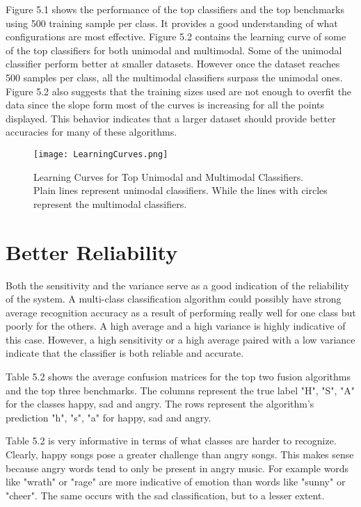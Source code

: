 Figure 5.1 shows the performance of the top classifiers and the top benchmarks using 500 training sample per class. 
It provides a good understanding of what configurations are most effective. Figure 5.2 contains the learning curve of some 
of the top classifiers for both unimodal and multimodal. Some of the unimodal classifier perform better at smaller datasets. However once the 
dataset reaches 500 samples per class,  all the multimodal classifiers surpass the unimodal ones. Figure 5.2 also suggests that the training sizes used are not enough
to overfit the data since the slope form most of the curves is increasing for all the points displayed. This behavior indicates that 
a larger dataset should provide better accuracies for many of these algorithms. 


\begin{figure}
 \centering
 \texttt{[image: LearningCurves.png]} 
 \caption{Learning Curves for Top Unimodal and Multimodal Classifiers. Plain lines represent unimodal classifiers. While the lines with circles represent the multimodal classifiers. }
\end{figure}

\section*{Better Reliability}

Both the sensitivity and the variance serve as a good indication of the reliability of the system.
A multi-class classification algorithm could possibly have strong average 
recognition accuracy as a result of performing really well for one class but 
poorly for the others.  A high average and a high variance is highly indicative of this case. However,
a high sensitivity or a high average paired with a low variance indicate that the classifier is 
both reliable and accurate. 

Table 5.2 shows the average confusion matrices for the top 
two fusion algorithms and the top three benchmarks. The columns represent 
the true label "H", "S", "A" for the classes happy, sad and angry. The rows 
represent the algorithm's prediction "h", "s", "a" for happy, sad and angry.

Table 5.2 is very informative in terms of what classes are harder to recognize. 
Clearly, happy songs pose a greater challenge than angry songs. This makes 
sense because angry words tend to only be present in angry music. For example 
words like "wrath" or "rage" are more indicative of emotion than words like "sunny" or "cheer".
 The same occurs with the sad classification, but to a lesser extent.
 
